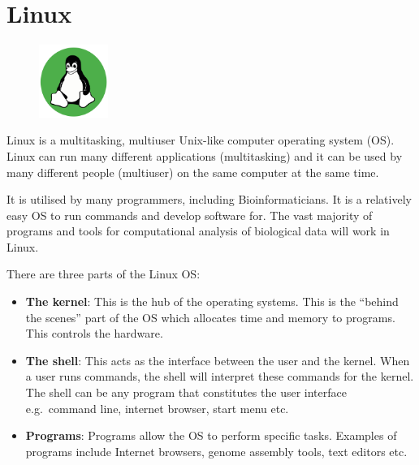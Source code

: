 \documentclass[
  letterpaper,
  DIV=11,
  numbers=noendperiod]{scrreprt}
\providecommand{\tightlist}{%
  \setlength{\itemsep}{0pt}\setlength{\parskip}{0pt}}\usepackage{longtable,booktabs,array}
\begin{document}

\hypertarget{linuxintro}{%
\chapter*{Linux}\label{linuxintro}}


\begin{figure}

{\centering \includegraphics[width=0.2\textwidth,height=\textheight]{figures/linux_beginner.png}

}

\end{figure}

Linux is a multitasking, multiuser Unix-like computer operating system
(OS). Linux can run many different applications (multitasking) and it
can be used by many different people (multiuser) on the same computer at
the same time.

It is utilised by many programmers, including Bioinformaticians. It is a
relatively easy OS to run commands and develop software for. The vast
majority of programs and tools for computational analysis of biological
data will work in Linux.

There are three parts of the Linux OS:

\begin{itemize}
\tightlist
\item
  \textbf{The kernel}: This is the hub of the operating systems. This is
  the ``behind the scenes'' part of the OS which allocates time and
  memory to programs. This controls the hardware.
\item
  \textbf{The shell}: This acts as the interface between the user and
  the kernel. When a user runs commands, the shell will interpret these
  commands for the kernel. The shell can be any program that constitutes
  the user interface e.g.~command line, internet browser, start menu
  etc.
\item
  \textbf{Programs}: Programs allow the OS to perform specific tasks.
  Examples of programs include Internet browsers, genome assembly tools,
  text editors etc.
\end{itemize}
\end{document}
